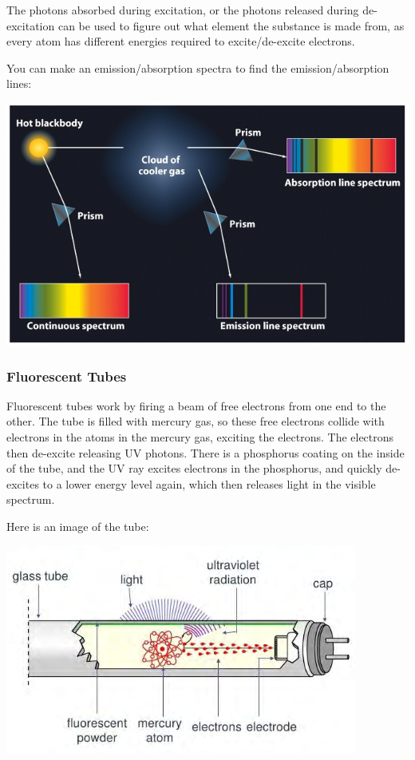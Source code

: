 \documentclass[a4paper, 12pt]{article}
\begin{document}
The photons absorbed during excitation, or the photons released during de-excitation can be used to figure out what element the substance is made from, as every atom has different energies required to excite/de-excite electrons.

You can make an emission/absorption spectra to find the emission/absorption lines:

\begin{center}
\includegraphics[width=\textwidth]{images/spectraElecEmmision.jpg}
\end{center}

\subsubsection{Fluorescent Tubes}

Fluorescent tubes work by firing a beam of free electrons from one end to the other.
The tube is filled with mercury gas, so these free electrons collide with electrons in the atoms in the mercury gas, exciting the electrons. The electrons then de-excite releasing UV photons. There is a phosphorus coating on the inside of the tube, and the UV ray excites electrons in the phosphorus, and quickly de-excites to a lower energy level again, which then releases light in the visible spectrum.

Here is an image of the tube:

\begin{center}
\includegraphics[width=\textwidth]{images/mercuryTube.png}
\end{center}
\end{document}
